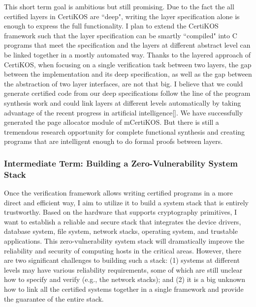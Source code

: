 \documentclass[a4paper, 10pt]{article}
\begin{document}
\begin{small}
This short term goal is ambitious  but still promising.
Due to the fact the all certified layers in CertiKOS
are ``deep", writing the layer specification alone is enough
to express the full functionality. I plan to extend the CertiKOS
framework such that the layer specification can be smartly 
``compiled" into C programs that meet the specification
and the layers at different abstract level can be linked together in a mostly automated way. Thanks to the layered approach of CertiKOS,
when focusing on a single verification task between two layers,
 the gap between the implementation and its deep specification, as well as the gap between the abstraction of two layer interfaces,
are not that big. I believe that we could generate
certified code from our deep specifications
follow the line of the program synthesis work
and could link layers at different levels automatically
by taking advantage of the recent progress in
artificial intelligence[]. We have successfully generated
the page allocator module of mCertiKOS. But there is
still a tremendous research opportunity for complete functional
synthesis and creating programs that are intelligent enough
to do formal proofs between layers.

\subsubsection*{\small Intermediate Term: Building a Zero-Vulnerability System Stack}
Once the verification framework allows writing certified programs in a more direct and efficient way, I aim to utilize it to build a system stack that is entirely trustworthy. Based on the hardware that supports cryptography primitives, I want to
establish a reliable and secure stack that integrates the device drivers,
database system, file system, network stacks, operating system,
 and trustable applications.
This zero-vulnerability system stack will dramatically improve
the reliability and security of computing hosts in the critical areas. 
However, there are two significant challenges to building such a stack:
(1)  systems at different levels may have various
reliability requirements, some of which are still unclear how
to specify and verify (e.g., the network stacks); and (2)
it is a big unknown how to link
all the certified systems together in a single framework
and provide the guarantee of the entire stack.


\end{small}
\end{document}
